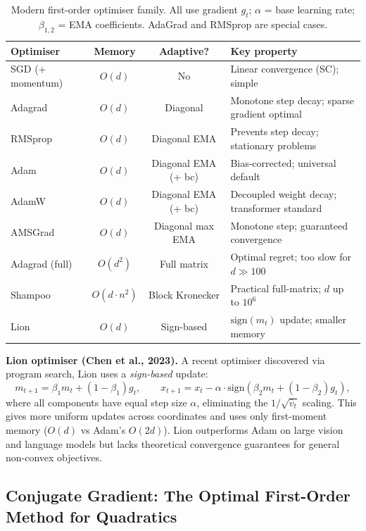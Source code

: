 \documentclass[11pt,a4paper]{article}
\theoremstyle{definition}
\begin{document}
\begin{table}[H]
\centering
\caption{Modern first-order optimiser family. All use gradient $g_t$; $\alpha$ = base learning rate; $\beta_{1,2}$ = EMA coefficients. AdaGrad and RMSprop are special cases.}
\label{tab:optimisers}
\begin{tabular}{lccl}
\toprule
\textbf{Optimiser} & \textbf{Memory} & \textbf{Adaptive?} & \textbf{Key property} \\
\midrule
SGD (+ momentum) & $O(d)$ & No & Linear convergence (SC); simple \\
Adagrad & $O(d)$ & Diagonal & Monotone step decay; sparse gradient optimal \\
RMSprop & $O(d)$ & Diagonal EMA & Prevents step decay; stationary problems \\
Adam & $O(d)$ & Diagonal EMA (+ bc) & Bias-corrected; universal default \\
AdamW & $O(d)$ & Diagonal EMA (+ bc) & Decoupled weight decay; transformer standard \\
AMSGrad & $O(d)$ & Diagonal max EMA & Monotone step; guaranteed convergence \\
Adagrad (full) & $O(d^2)$ & Full matrix & Optimal regret; too slow for $d \gg 100$ \\
Shampoo & $O(d \cdot n^2)$ & Block Kronecker & Practical full-matrix; $d$ up to $10^6$ \\
Lion & $O(d)$ & Sign-based & $\text{sign}(m_t)$ update; smaller memory \\
\bottomrule
\end{tabular}
\end{table}

\noindent\textbf{Lion optimiser (Chen et al., 2023).} A recent optimiser discovered via program search, Lion uses a \emph{sign-based} update:
\begin{equation}
m_{t+1} = \beta_1 m_t + (1-\beta_1) g_t, \qquad x_{t+1} = x_t - \alpha \cdot \text{sign}(\beta_2 m_t + (1-\beta_2) g_t),
\label{eq:lion}
\end{equation}
where all components have equal step size $\alpha$, eliminating the $1/\sqrt{\hat{v}_t}$ scaling. This gives more uniform updates across coordinates and uses only first-moment memory ($O(d)$ vs Adam's $O(2d)$). Lion outperforms Adam on large vision and language models but lacks theoretical convergence guarantees for general non-convex objectives.

\subsection{Conjugate Gradient: The Optimal First-Order Method for Quadratics}
\end{document}
